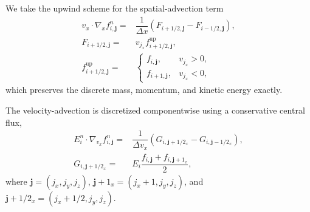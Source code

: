 \documentclass[preprint,1p,times]{elsarticle}
\theoremstyle{definition}
\theoremstyle{remark}
\begin{document}
We take the upwind scheme for the spatial-advection term
\begin{equation}
\begin{aligned}
    v_{x} \cdot \nabla_{x} f_{i,\bm{j}}^{n} =& \dfrac{1}{\Delta x} \left( F_{i+1/2,\bm{j}} - F_{i-1/2,\bm{j}} \right), \\
    F_{i+1/2,\bm{j}} =& v_{j_x} f_{i+1/2,\bm{j}}^{\mathrm{up}} , \\
    f_{i+1/2,\bm{j}}^{\mathrm{up}} =&
    \begin{cases}
        f_{i,\bm{j}}, & v_{j_x} > 0, \\
        f_{i+1,\bm{j}}, & v_{j_x} < 0 ,
    \end{cases}
\end{aligned}
\end{equation}
which preserves the discrete mass, momentum, and kinetic energy exactly.

The velocity-advection is discretized componentwise using a conservative central flux,
\begin{equation}
\begin{aligned}
    E_{i}^{n} \cdot \nabla_{v_{x}} f_{i,\bm{j}}^{n} =& \dfrac{1}{\Delta v_x} \left( G_{i,\bm j+1/2_x} - G_{i,\bm j-1/2_x} \right) , \\
    G_{i,\bm j+1/2_x} =& E_i \dfrac{f_{i,\bm j} + f_{i,\bm j+1_x}}{2} ,
\end{aligned}
\end{equation}
where $\bm j=(j_x,j_y,j_z)$, $\bm j+1_x=(j_x+1,j_y,j_z)$, and $\bm j+1/2_x=(j_x+1/2,j_y,j_z)$.
\end{document}
